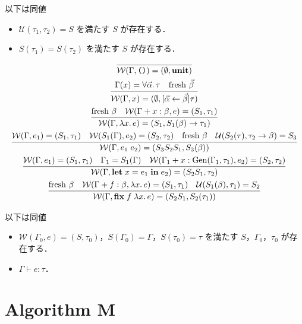 \begin{theorem}
  以下は同値
  \begin{itemize}
    \item $\mathcal{U}(\tau_1, \tau_2) = S$ を満たす $S$ が存在する．
    \item $S(\tau_1) = S(\tau_2)$ を満たす $S$ が存在する．
  \end{itemize}
\end{theorem}

\begin{gather*}
  \infer{\mathcal{W}(\Gamma, \text{\texttt{()}}) = (\emptyset, \mathbf{unit})}{}
  \\
  \infer{\mathcal{W}(\Gamma, x) = (\emptyset, [\vec{\alpha} \assign \vec{\beta}]\tau)}{
    \Gamma(x) = \forall\vec{\alpha}\ldotp \tau
    &
    \text{fresh $\vec{\beta}$}
  }
  \\
  \infer{\mathcal{W}(\Gamma, \lambda x\ldotp e) = (S_1, S_1(\beta) \to \tau_1)}{
    \text{fresh $\beta$}
    &
    \mathcal{W}(\Gamma + x:\beta, e) = (S_1, \tau_1)
  }
  \\
  \infer{\mathcal{W}(\Gamma, e_1\; e_2) = (S_3S_2S_1, S_3(\beta))}{
    \mathcal{W}(\Gamma, e_1) = (S_1, \tau_1)
    &
    \mathcal{W}(S_1(\Gamma), e_2) = (S_2, \tau_2)
    &
    \text{fresh $\beta$}
    &
    \mathcal{U}(S_2(\tau), \tau_2 \to \beta) = S_3
  }
  \\
  \infer{\mathcal{W}(\Gamma, \mathbf{let}\;x = e_1\;\mathbf{in}\;e_2) = (S_2S_1, \tau_2)}{
    \mathcal{W}(\Gamma, e_1) = (S_1, \tau_1)
    &
    \Gamma_1 = S_1(\Gamma)
    &
    \mathcal{W}(\Gamma_1 + x:\mathrm{Gen}(\Gamma_1, \tau_1), e_2) = (S_2, \tau_2)
  }
  \\
  \infer{\mathcal{W}(\Gamma, \mathbf{fix}\;f\;\lambda x\ldotp e) = (S_2S_1, S_2(\tau_1))}{
    \text{fresh $\beta$}
    &
    \mathcal{W}(\Gamma + f:\beta, \lambda x\ldotp e) = (S_1, \tau_1)
    &
    \mathcal{U}(S_1(\beta), \tau_1) = S_2
  }
\end{gather*}

\begin{theorem}
  以下は同値
  \begin{itemize}
    \item $\mathcal{W}(\Gamma_0, e) = (S, \tau_0)$，$S(\Gamma_0) = \Gamma$，$S(\tau_0) = \tau$ を満たす $S$，$\Gamma_0$，$\tau_0$ が存在する．
    \item $\Gamma \vdash e: \tau$．
  \end{itemize}
\end{theorem}

\section{Algorithm M}

